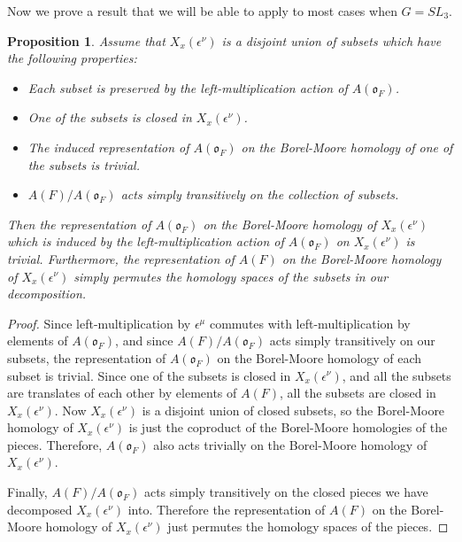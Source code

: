 \documentclass{amsart}
\newtheorem{prop}{Proposition}[subsection]
\theoremstyle{definition}
\def\O{\mathfrak{o}}
\def\e{\epsilon}
\def\A{A(\O_F)}
\def\en{\e^{\nu}}
\def\X{X_x(\en)}
\begin{document}
  Now we prove a result that we will be able to apply to most cases when $G =
  SL_3$.
  \begin{prop}
    \label{prop:Trivial-For-Closed-Transitive-Set}
    Assume that $\X$ is a disjoint union of subsets which have the following
    properties:
    \begin{itemize}
      \item Each subset is preserved by the left-multiplication action of
	$\A$.
      \item One of the subsets is closed in $\X$.
      \item The induced representation of $\A$ on the Borel-Moore homology of
        one of the subsets is trivial.
      \item $A(F)/\A$ acts simply transitively on the collection of subsets.
    \end{itemize}
    Then the representation of $\A$ on the Borel-Moore homology of $\X$ which
    is induced by the left-multiplication action of $\A$ on $\X$ is trivial.
    Furthermore, the representation of $A(F)$ on the Borel-Moore homology of
    $\X$ simply permutes the homology spaces of the subsets in our
    decomposition.
  \end{prop}
  \begin{proof}
    Since left-multiplication by $\e^\mu$ commutes with left-multiplication by
    elements of $\A$, and since $A(F)/\A$ acts simply transitively on our
    subsets, the representation of $\A$ on the Borel-Moore homology of each
    subset is trivial.  Since one of the subsets is closed in $\X$, and all the
    subsets are translates of each other by elements of $A(F)$, all the
    subsets are closed in $\X$.  Now $\X$ is a disjoint union of closed
    subsets, so the Borel-Moore homology of $\X$ is just the coproduct of the
    Borel-Moore homologies of the pieces.  Therefore, $\A$ also acts trivially
    on the Borel-Moore homology of $\X$.

    Finally, $A(F)/\A$ acts simply transitively on the closed pieces we have
    decomposed $\X$ into.  Therefore the representation of $A(F)$ on the
    Borel-Moore homology of $\X$ just permutes the homology spaces of the
    pieces.
  \end{proof}
  
\end{document}
